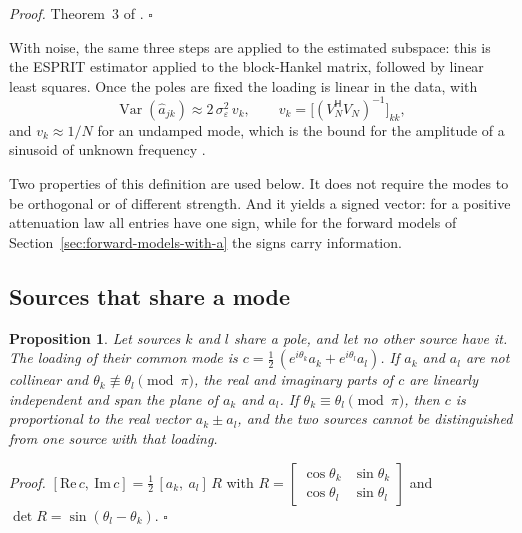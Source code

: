 \documentclass{article}
\newtheorem{proposition}{\bf Proposition}
\begin{document}
\textit{Proof.} Theorem~3 of \cite{ref-companionA}. $\square$

With noise, the same three steps are applied to the estimated subspace: this is the ESPRIT estimator \cite{ref-Roy, ref-Hua} applied to the block-Hankel matrix, followed by linear least squares. Once the poles are fixed the loading is linear in the data, with \[
\operatorname{Var}(\widehat{a}_{jk}) \approx 2\, \sigma_\varepsilon^{2}\, v_k, \qquad v_k = \bigl[(V_N^{\mathsf{H}} V_N)^{-1}\bigr]_{kk},
\] and $v_k \approx 1/N$ for an undamped mode, which is the bound for the amplitude of a sinusoid of unknown frequency \cite{ref-Rife}.

Two properties of this definition are used below. It does not require the modes to be orthogonal or of different strength. And it yields a signed vector: for a positive attenuation law all entries have one sign, while for the forward models of Section~\ref{sec:forward-models-with-a} the signs carry information.

\subsection{Sources that share a mode}\label{sec:sources-that-share-a}

\begin{proposition} \label{prop:shared-mode}
Let sources $k$ and $l$ share a pole, and let no other source have it. The loading of their common mode is $c = \tfrac{1}{2}\,(e^{i\theta_k} a_k + e^{i\theta_l} a_l)$. If $a_k$ and $a_l$ are not collinear and $\theta_k \not\equiv \theta_l \pmod{\pi}$, the real and imaginary parts of $c$ are linearly independent and span the plane of $a_k$ and $a_l$. If $\theta_k \equiv \theta_l \pmod{\pi}$, then $c$ is proportional to the real vector $a_k \pm a_l$, and the two sources cannot be distinguished from one source with that loading.
\end{proposition}

\textit{Proof.} $[\mathrm{Re}\, c,\ \mathrm{Im}\, c] = \tfrac{1}{2}\,[a_k,\ a_l]\, R$ with $R = \begin{bmatrix} \cos\theta_k & \sin\theta_k \\ \cos\theta_l & \sin\theta_l \end{bmatrix}$ and $\det R = \sin(\theta_l - \theta_k)$. $\square$
\end{document}
